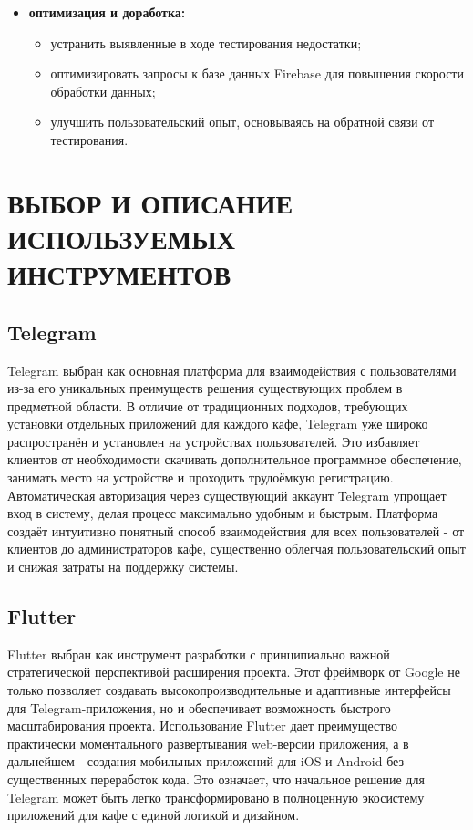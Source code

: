 {\begin{itemize}
        \item \textbf{оптимизация и доработка:}
        \begin{itemize}
            \item устранить выявленные в ходе тестирования недостатки;
            \item оптимизировать запросы к базе данных Firebase для повышения скорости обработки данных;
            \item улучшить пользовательский опыт, основываясь на обратной связи от тестирования.
        \end{itemize}
    \end{itemize}


    \newpage
    \section{\MakeUppercase{Выбор и описание используемых инструментов}}
    {
        \subsection{Telegram}
        {
            Telegram выбран как основная платформа для взаимодействия с пользователями из-за его уникальных преимуществ решения существующих проблем в предметной области. В отличие от традиционных подходов, требующих установки отдельных приложений для каждого кафе, Telegram уже широко распространён и установлен на устройствах пользователей. Это избавляет клиентов от необходимости скачивать дополнительное программное обеспечение, занимать место на устройстве и проходить трудоёмкую регистрацию. Автоматическая авторизация через существующий аккаунт Telegram упрощает вход в систему, делая процесс максимально удобным и быстрым. Платформа создаёт интуитивно понятный способ взаимодействия для всех пользователей - от клиентов до администраторов кафе, существенно облегчая пользовательский опыт и снижая затраты на поддержку системы.
        }

        \subsection{Flutter}
        {
            Flutter выбран как инструмент разработки с принципиально важной стратегической перспективой расширения проекта. Этот фреймворк от Google не только позволяет создавать высокопроизводительные и адаптивные интерфейсы для Telegram-приложения, но и обеспечивает возможность быстрого масштабирования проекта. Использование Flutter дает преимущество практически моментального развертывания web-версии приложения, а в дальнейшем - создания мобильных приложений для iOS и Android без существенных переработок кода. Это означает, что начальное решение для Telegram может быть легко трансформировано в полноценную экосистему приложений для кафе с единой логикой и дизайном.
        }

}}
